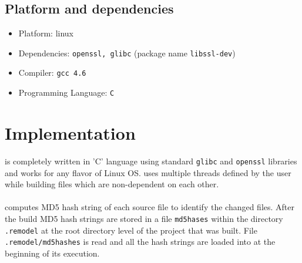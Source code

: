 \documentclass[12pt,letterpaper,titlepage, one-sided]{article}
\begin{document}
	\subsection{Platform and dependencies}
	\begin{itemize}
		\item Platform: linux  
		\item Dependencies: \texttt{openssl, glibc} (package name \texttt{libssl-dev})
		\item Compiler: \texttt{gcc 4.6}
		\item Programming Language: \texttt{C}
	\end{itemize}

\section{Implementation}
\remodel is completely written in 'C' language using standard \texttt{glibc} and \texttt{openssl} libraries and works for any flavor of Linux OS. \remodel uses multiple threads defined by the user while building files which are non-dependent on each other.
\\ \\
\remodel computes MD5 hash string of each source file to identify the changed files. After the build MD5 hash strings are stored in a file \texttt{md5hases} within the directory \texttt{.remodel} at the root directory level of the project that was built. File \texttt{.remodel/md5hashes} is read and all the hash strings are loaded into \remodel at the beginning of its execution.
\end{document}
